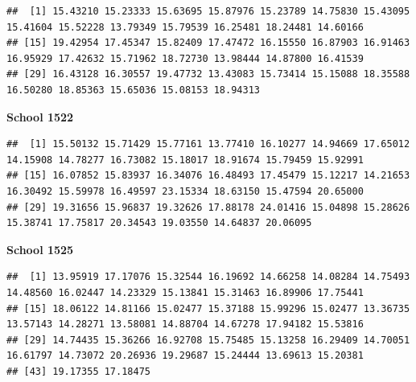 \documentclass[
  12pt,
]{book}
\newenvironment{Shaded}{\begin{snugshade}}{\end{snugshade}}
\newcommand{\AttributeTok}[1]{\textcolor[rgb]{0.77,0.63,0.00}{#1}}
\newcommand{\DecValTok}[1]{\textcolor[rgb]{0.00,0.00,0.81}{#1}}
\newcommand{\FunctionTok}[1]{\textcolor[rgb]{0.00,0.00,0.00}{#1}}
\newcommand{\NormalTok}[1]{#1}
\newcommand{\SpecialCharTok}[1]{\textcolor[rgb]{0.00,0.00,0.00}{#1}}
\begin{document}
\begin{verbatim}
##  [1] 15.43210 15.23333 15.63695 15.87976 15.23789 14.75830 15.43095 15.41604 15.52228 13.79349 15.79539 16.25481 18.24481 14.60166
## [15] 19.42954 17.45347 15.82409 17.47472 16.15550 16.87903 16.91463 16.95929 17.42632 15.71962 18.72730 13.98444 14.87800 16.41539
## [29] 16.43128 16.30557 19.47732 13.43083 15.73414 15.15088 18.35588 16.50280 18.85363 15.65036 15.08153 18.94313
\end{verbatim}

\textbf{School 1522}

\begin{Shaded}
\end{Shaded}

\begin{verbatim}
##  [1] 15.50132 15.71429 15.77161 13.77410 16.10277 14.94669 17.65012 14.15908 14.78277 16.73082 15.18017 18.91674 15.79459 15.92991
## [15] 16.07852 15.83937 16.34076 16.48493 17.45479 15.12217 14.21653 16.30492 15.59978 16.49597 23.15334 18.63150 15.47594 20.65000
## [29] 19.31656 15.96837 19.32626 17.88178 24.01416 15.04898 15.28626 15.38741 17.75817 20.34543 19.03550 14.64837 20.06095
\end{verbatim}

\textbf{School 1525}

\begin{Shaded}
\end{Shaded}

\begin{verbatim}
##  [1] 13.95919 17.17076 15.32544 16.19692 14.66258 14.08284 14.75493 14.48560 16.02447 14.23329 15.13841 15.31463 16.89906 17.75441
## [15] 18.06122 14.81166 15.02477 15.37188 15.99296 15.02477 13.36735 13.57143 14.28271 13.58081 14.88704 14.67278 17.94182 15.53816
## [29] 14.74435 15.36266 16.92708 15.75485 15.13258 16.29409 14.70051 16.61797 14.73072 20.26936 19.29687 15.24444 13.69613 15.20381
## [43] 19.17355 17.18475
\end{verbatim}
\end{document}
